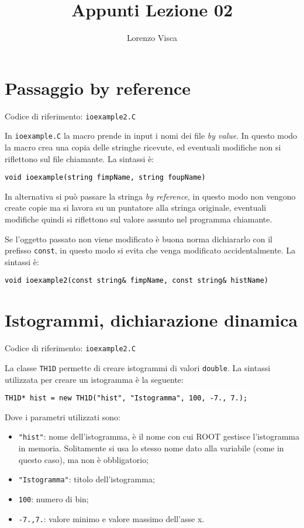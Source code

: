 \documentclass{article}
\title{Appunti Lezione 02}
\author{Lorenzo Visca}
\date{}
\newcommand{\ttt}{\texttt}
\newcommand{\tcpp}[1]{\hspace{10pt}\colorbox{background}{\textcolor{black}{\texttt{#1}}}}
\begin{document}
\maketitle


\section{Passaggio by reference}
Codice di riferimento: \ttt{ioexample2.C} \vspace{10pt}

In \ttt{ioexample.C} la macro prende in input i nomi dei file \textit{by value}. In questo modo la macro crea una copia delle stringhe ricevute, ed eventuali modifiche non si riflettono sul file chiamante. La sintassi è:

\tcpp{void ioexample(string fimpName, string foupName)}

In alternativa si può passare la stringa \textit{by reference}, in questo modo non vengono create copie ma si lavora su un puntatore alla stringa originale, eventuali modifiche quindi si riflettono sul valore assunto nel programma chiamante. 

Se l'oggetto passato non viene modificato è buona norma dichiararlo con il prefisso \ttt{const}, in questo modo si evita che venga modificato accidentalmente. La sintassi è:

\tcpp{void ioexample2(const string\& fimpName, const string\& histName)}

\section{Istogrammi, dichiarazione dinamica}
Codice di riferimento: \ttt{ioexample2.C} \vspace{10pt}

La classe \ttt{TH1D} permette di creare istogrammi di valori \ttt{double}. La sintassi utilizzata per creare un istogramma è la seguente:

\tcpp{TH1D* hist = new TH1D("hist", "Istogramma", 100, -7., 7.);}

Dove i parametri utilizzati sono:
\begin{itemize}
    \item \ttt{"hist"}: nome dell'istogramma, è il nome con cui ROOT gestisce l'istogramma in memoria. Solitamente si usa lo stesso nome dato alla variabile (come in questo caso), ma non è obbligatorio;
    \item \ttt{"Istogramma"}: titolo dell'istogramma;
    \item \ttt{100}: numero di bin;
    \item \ttt{-7.,7.}: valore minimo e valore massimo dell'asse x.
\end{itemize}
\end{document}

